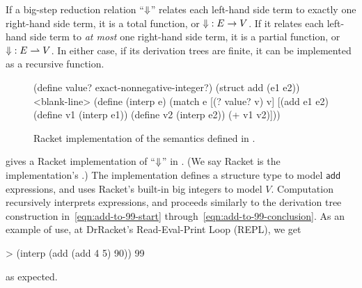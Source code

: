 If a big-step reduction relation ``$\operatorname{\Downarrow}$'' relates each left-hand side term to exactly one right-hand side term, it is a total function, or $\operatorname{\Downarrow} : E \to V$.
If it relates each left-hand side term to \emph{at most} one right-hand side term, it is a partial function, or $\operatorname{\Downarrow} : E \rightharpoonup V$.
In either case, if its derivation trees are finite, it can be implemented as a recursive function.

\begin{figure}[tb]\centering
\begin{schemedisplay}
(define value? exact-nonnegative-integer?)
(struct add (e1 e2))
<blank-line>
(define (interp e)
  (match e
    [(? value? v)  v]
    [(add e1 e2)  (define v1 (interp e1))
                  (define v2 (interp e2))
                  (+ v1 v2)]))
\end{schemedisplay}
\bottomhrule
\caption[Implementation of the big-step semantics]{Racket implementation of the semantics defined in .}
\label{fig:add-language-impl}
\end{figure}

 gives a Racket implementation of ``$\operatorname{\Downarrow}$'' in .
(We say Racket is the implementation's .)
The implementation defines a structure type  to model $\mathsf{add}$ expressions, and uses Racket's built-in big integers to model $V$.
Computation recursively interprets expressions, and proceeds similarly to the derivation tree construction in~\eqref{eqn:add-to-99-start} through~\eqref{eqn:add-to-99-conclusion}.
As an example of use, at DrRacket's Read-Eval-Print Loop (REPL), we get
\begin{center}
\singlespacing
\begin{schemedisplay}
          > (interp (add (add 4 5) 90))
          99
\end{schemedisplay}
\end{center}
as expected.

